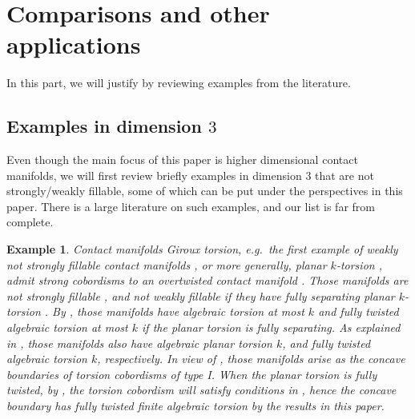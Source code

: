 \documentclass[11pt]{amsart}
\numberwithin{equation}{section}
\newtheorem{example}[theorem]{\textbf{Example}}
\begin{document}
\section{Comparisons and other applications}\label{s:comparison_application}
In this part, we will justify  by reviewing examples from the literature. 
\subsection{Examples in dimension $3$}
Even though the main focus of this paper is higher dimensional contact manifolds, we will first review briefly examples in dimension $3$ that are not strongly/weakly fillable, some of which can be put under the perspectives in this paper. There is a large literature on such examples, and our list is far from complete.
\begin{example}
    Contact manifolds Giroux torsion, e.g.\ the first example of weakly not strongly fillable contact manifolds \cite{Eli96}, or more generally, planar $k$-torsion \cite[Definition 2.13]{zbMATH06218377}, admit strong cobordisms to an overtwisted contact manifold \cite[Theorem 1]{Wen13}. Those manifolds are not strongly fillable \cite[Theorem 1]{zbMATH06218377}, and not weakly fillable if they have fully separating planar $k$-torsion \cite[Corollary 3]{zbMATH06026209}. By \cite[Theorem 6]{LW}, those manifolds have algebraic torsion at most $k$ and fully twisted algebraic torsion at most $k$ if the planar torsion is fully separating. As explained in \cite[Theorem 3.17]{moreno2024landscape}, those manifolds also have algebraic planar torsion $k$, and fully twisted algebraic torsion $k$, respectively. In view of , those manifolds arise as the concave boundaries of torsion cobordisms of type I. When the planar torsion is fully twisted, by \cite[Theorem 2]{Wen13}, the torsion cobordism will satisfy conditions in , hence the concave boundary has fully twisted finite algebraic torsion by the results in this paper. 
\end{example}
\end{document}
